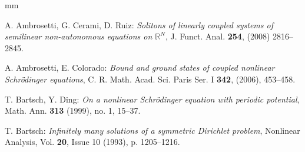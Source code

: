 \documentclass{scrartcl}
\numberwithin{equation}{section}
\begin{document}
\begin{thebibliography}{99}
 mm



 A. Ambrosetti, G. Cerami, D. Ruiz: {\em Solitons of linearly coupled systems of semilinear non-autonomous equations on $\mathbb{R}^N$}, J. Funct. Anal. \textbf{254}, (2008) 2816--2845.

 A. Ambrosetti, E. Colorado: {\em Bound and ground states of coupled nonlinear Schr\"odinger equations}, C. R. Math. Acad. Sci. Paris Ser. I \textbf{342}, (2006), 453--458.


 T. Bartsch, Y. Ding: {\em On a nonlinear Schr\"odinger equation with periodic potential}, Math. Ann. \textbf{313} (1999), no. 1, 15–37. 







 T. Bartsch: {\em Infinitely many solutions of a symmetric Dirichlet problem}, Nonlinear Analysis, Vol. \textbf{20}, Issue 10 (1993), p. 1205--1216.


\end{thebibliography}
\end{document}
